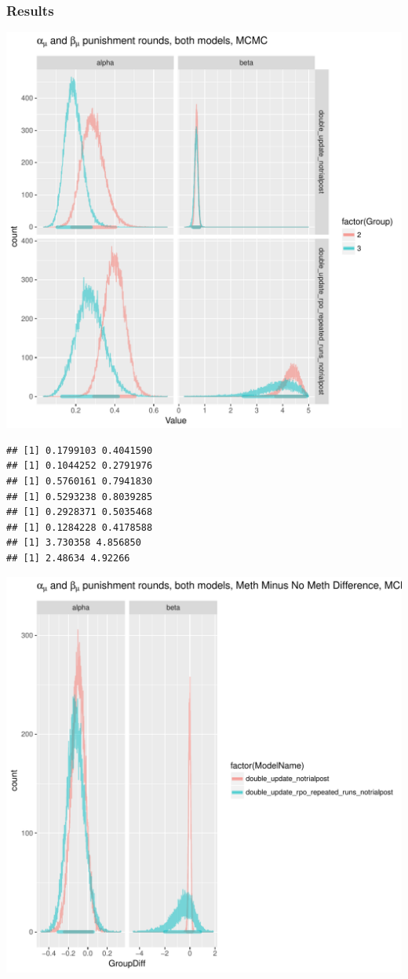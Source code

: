 \documentclass{article}\usepackage[]{graphicx}\usepackage[]{color}
\makeatletter
\def\maxwidth{ %
  \ifdim\Gin@nat@width>\linewidth
    \linewidth
  \else
    \Gin@nat@width
  \fi
}
\newenvironment{kframe}{%
 \def\at@end@of@kframe{}%
 \ifinner\ifhmode%
  \def\at@end@of@kframe{\end{minipage}}%
  \begin{minipage}{\columnwidth}%
 \fi\fi%
 \def\FrameCommand##1{\hskip\@totalleftmargin \hskip-\fboxsep
 \colorbox{shadecolor}{##1}\hskip-\fboxsep
     \hskip-\linewidth \hskip-\@totalleftmargin \hskip\columnwidth}%
 \MakeFramed {\advance\hsize-\width
   \@totalleftmargin\z@ \linewidth\hsize
   \@setminipage}}%
 {\par\unskip\endMakeFramed%
 \at@end@of@kframe}
\newenvironment{knitrout}{}{} %
\makeatother
\begin{document}
\subsubsection*{Results}
\begin{knitrout}
\color{fgcolor}
\includegraphics[width=\maxwidth]{figure/unnamed-chunk-7-1} 
\begin{kframe}\begin{verbatim}
## [1] 0.1799103 0.4041590
## [1] 0.1044252 0.2791976
## [1] 0.5760161 0.7941830
## [1] 0.5293238 0.8039285
## [1] 0.2928371 0.5035468
## [1] 0.1284228 0.4178588
## [1] 3.730358 4.856850
## [1] 2.48634 4.92266
\end{verbatim}
\end{kframe}
\includegraphics[width=\maxwidth]{figure/unnamed-chunk-7-2} 

\end{knitrout}
\end{document}
